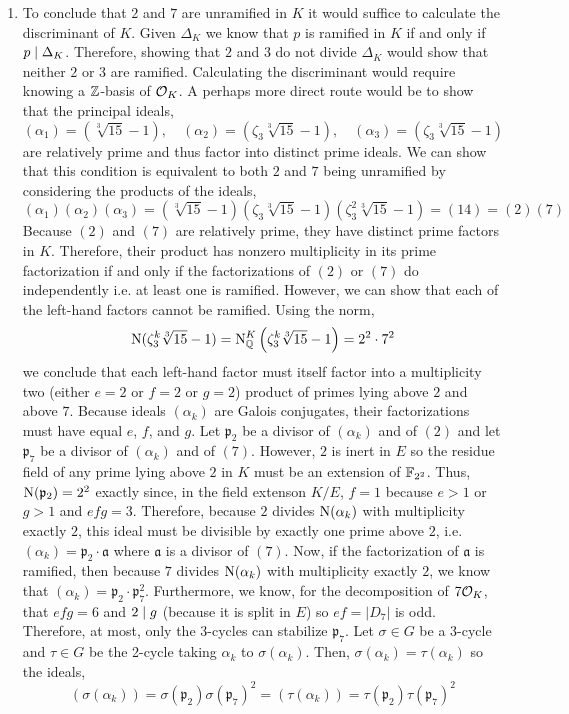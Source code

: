\documentclass[12pt]{extarticle}
\begin{document}
\begin{enumerate}
\begin{enumerate}
\item To conclude that $2$ and $7$ are unramified in $K$ it would suffice to calculate the discriminant of $K$. Given $\Delta_K$ we know that $p$ is ramified in $K$ if and only if $p \mid \Delta_K$. Therefore, showing that $2$ and $3$ do not divide $\Delta_K$ would show that neither $2$ or $3$ are ramified. Calculating the discriminant would require knowing a $\mathbb{Z}$-basis of $\mathcal{O}_{K}$. A perhaps more direct route would be to show that the principal ideals,
\[(\alpha_1) = (\sqrt[3]{15} - 1), \quad (\alpha_2) = (\zeta_3 \sqrt[3]{15} - 1), \quad (\alpha_3) = (\zeta_3 \sqrt[3]{15} - 1)\] 
are relatively prime and thus factor into distinct prime ideals. We can show that this condition is equivalent to  both $2$ and $7$ being unramified by considering the products of the ideals,
\[ (\alpha_1)(\alpha_2)(\alpha_3) =  (\sqrt[3]{15} - 1)( \zeta_3 \sqrt[3]{15} - 1)(\zeta_3^2 \sqrt[3]{15} - 1) = (14) = (2)(7)\] 
Because $(2)$ and $(7)$ are relatively prime, they have distinct prime factors in $K$. Therefore, their product has nonzero multiplicity in its prime factorization if and only if the factorizations of $(2)$ or $(7)$ do independently i.e. at least one is ramified. However, we can show that each of the left-hand factors cannot be ramified. Using the norm, 
\[ \mathrm{N}(\zeta_3^k \sqrt[3]{15} - 1) = \mathrm{N}^{K}_{\mathbb{Q}}\left(\zeta_3^k \sqrt[3]{15} - 1\right) = 2^2 \cdot 7^2\]
we conclude that each left-hand factor must itself factor into a multiplicity two (either $e = 2$ or $f = 2$ or $g = 2$) product of primes lying above $2$ and above $7$. Because ideals $(\alpha_k)$ are Galois conjugates, their factorizations must have equal $e$, $f$,  and $g$. Let $\mathfrak{p}_2$ be a divisor of $(\alpha_k)$ and of $(2)$ and let $\mathfrak{p}_7$ be a divisor of $(\alpha_k)$ and of $(7)$. However, $2$ is inert in $E$ so the residue field of any prime lying above $2$ in $K$ must be an extension of $\mathbb{F}_{2^2}$. Thus, $\mathrm{N}(\mathfrak{p}_2) = 2^2$ exactly since, in the field extenson $K/E$, $f = 1$ because $e > 1$ or $g > 1$ and $efg = 3$. Therefore, because $2$ divides $\mathrm{N}(\alpha_k)$ with multiplicity exactly $2$, this ideal must be divisible by exactly one prime above $2$, i.e. $(\alpha_k) = \mathfrak{p}_2 \cdot \mathfrak{a}$ where $\mathfrak{a}$ is a divisor of $(7)$. Now,
if the factorization of $\mathfrak{a}$ is ramified, then because $7$ divides $\mathrm{N}(\alpha_k)$ with multiplicity exactly $2$, we know that $(\alpha_k) = \mathfrak{p}_2 \cdot \mathfrak{p}_7^2$. Furthermore, we know, for the decomposition of $7 \mathcal{O}_{K}$, that $efg = 6$ and $2 \mid g$ (because it is split in $E$) so $ef = |D_7|$ is odd. Therefore, at most, only the $3$-cycles can stabilize $\mathfrak{p}_7$. Let $\sigma \in G$ be a 3-cycle and $\tau \in G$ be the 2-cycle taking $\alpha_k$ to $\sigma(\alpha_k)$. Then, $\sigma(\alpha_k) = \tau(\alpha_k)$ so the ideals, \[(\sigma(\alpha_k)) = \sigma(\mathfrak{p}_2) \sigma(\mathfrak{p}_7)^2 = (\tau(\alpha_k)) = \tau(\mathfrak{p}_2) \tau(\mathfrak{p}_7)^2\]

\end{enumerate}
\end{enumerate}
\end{document}
